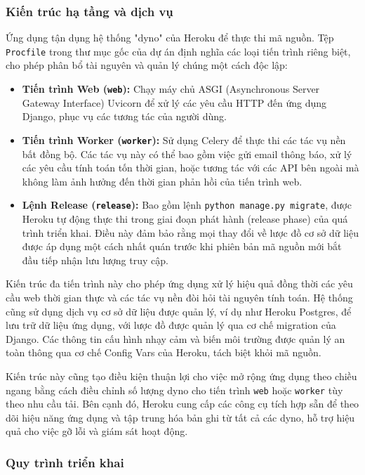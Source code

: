\subsubsection*{Kiến trúc hạ tầng và dịch vụ}
Ứng dụng tận dụng hệ thống "dyno" của Heroku để thực thi mã nguồn. Tệp \texttt{Procfile} trong thư mục gốc của dự án định nghĩa các loại tiến trình riêng biệt, cho phép phân bổ tài nguyên và quản lý chúng một cách độc lập:
\begin{itemize}
    \item \textbf{Tiến trình Web (\texttt{web}):} Chạy máy chủ ASGI (Asynchronous Server Gateway Interface) Uvicorn để xử lý các yêu cầu HTTP đến ứng dụng Django, phục vụ các tương tác của người dùng.
    \item \textbf{Tiến trình Worker (\texttt{worker}):} Sử dụng Celery để thực thi các tác vụ nền bất đồng bộ. Các tác vụ này có thể bao gồm việc gửi email thông báo, xử lý các yêu cầu tính toán tốn thời gian, hoặc tương tác với các API bên ngoài mà không làm ảnh hưởng đến thời gian phản hồi của tiến trình web.
    \item \textbf{Lệnh Release (\texttt{release}):} Bao gồm lệnh \texttt{python manage.py migrate}, được Heroku tự động thực thi trong giai đoạn phát hành (release phase) của quá trình triển khai. Điều này đảm bảo rằng mọi thay đổi về lược đồ cơ sở dữ liệu được áp dụng một cách nhất quán trước khi phiên bản mã nguồn mới bắt đầu tiếp nhận lưu lượng truy cập.
\end{itemize}
Kiến trúc đa tiến trình này cho phép ứng dụng xử lý hiệu quả đồng thời các yêu cầu web thời gian thực và các tác vụ nền đòi hỏi tài nguyên tính toán. Hệ thống cũng sử dụng dịch vụ cơ sở dữ liệu được quản lý, ví dụ như Heroku Postgres, để lưu trữ dữ liệu ứng dụng, với lược đồ được quản lý qua cơ chế migration của Django. Các thông tin cấu hình nhạy cảm và biến môi trường được quản lý an toàn thông qua cơ chế Config Vars của Heroku, tách biệt khỏi mã nguồn.

Kiến trúc này cũng tạo điều kiện thuận lợi cho việc mở rộng ứng dụng theo chiều ngang bằng cách điều chỉnh số lượng dyno cho tiến trình \texttt{web} hoặc \texttt{worker} tùy theo nhu cầu tải. Bên cạnh đó, Heroku cung cấp các công cụ tích hợp sẵn để theo dõi hiệu năng ứng dụng và tập trung hóa bản ghi từ tất cả các dyno, hỗ trợ hiệu quả cho việc gỡ lỗi và giám sát hoạt động.

\subsubsection*{Quy trình triển khai}

